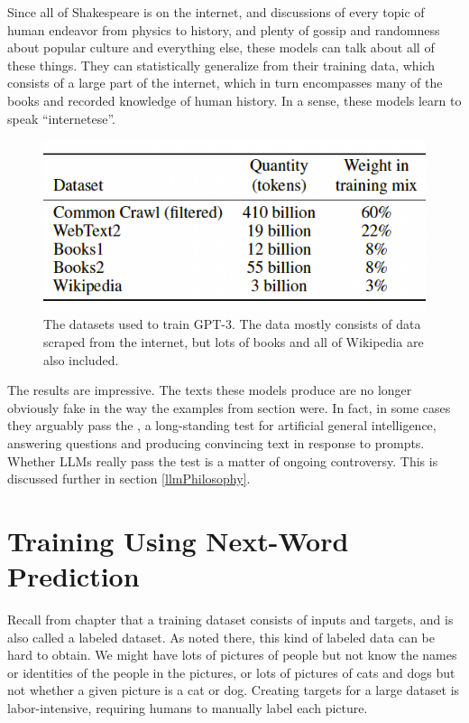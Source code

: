 Since all of Shakespeare is on the internet, and discussions of every topic of human endeavor from physics to history, and plenty of gossip and randomness about popular culture and everything else, these models can talk about all of these things. They can statistically generalize from their training data, which consists of a large part of the internet, which in turn encompasses many of the books and recorded knowledge of human history. In a sense, these models learn to speak ``internetese''. 

\begin{figure}[h]
\centering
\includegraphics[scale=.4]{./images/gptDatasets}
\caption[From \cite{brown2020language}.]{The datasets used to train GPT-3. The data mostly consists of data scraped from the internet, but lots of books and all of Wikipedia are also included.}
\label{gptDatasets}
\end{figure}

The results are impressive. The texts these models produce are no longer obviously fake in the way the examples from section  were. In fact, in some cases they arguably pass the , a long-standing test for artificial general intelligence, answering questions and producing convincing  text in response to prompts. Whether LLMs really pass the test is a matter of ongoing controversy. This is discussed further in section \ref{llmPhilosophy}.

\section{Training Using Next-Word Prediction}

Recall from chapter  that a training dataset consists of inputs and targets, and is also called a labeled dataset. As noted there, this kind of labeled data can be hard to obtain. We might have lots of pictures of people but not know the names or identities of the people in the pictures, or lots of pictures of cats and dogs but not whether a given picture is a cat or dog. Creating targets for a large dataset is labor-intensive, requiring humans to manually label each picture.

